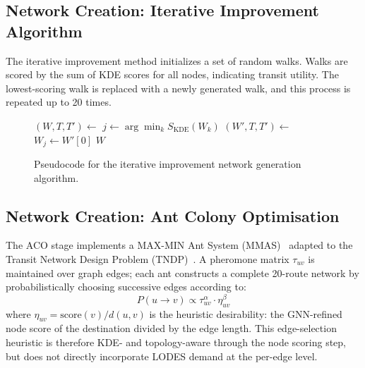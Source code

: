 \documentclass[sigconf,nonacm]{acmart}
\begin{document}
\subsection{Network Creation: Iterative Improvement Algorithm}

The iterative improvement method initializes a set of random walks. Walks are scored by the sum of KDE scores for all nodes, indicating transit utility. The lowest-scoring walk is replaced with a newly generated walk, and this process is repeated up to 20 times.

\begin{figure}[h]
\centering
\begin{minipage}{1\linewidth}
\begin{algorithmic}
    \State $(W, T, T') \gets$ 
        \State $j \gets \arg\min_{k} S_{\mathrm{KDE}}(W_k)$  
        \State $(W', T, T') \gets$ 
        \State $W_j \gets W'[0]$  
    \EndFor
    \State \Return $W$
\EndFunction
\end{algorithmic}
\caption{Pseudocode for the iterative improvement network generation algorithm.}
\label{fig:iterative_pseudocode}
\end{minipage}
\end{figure}

\subsection{Network Creation: Ant Colony Optimisation}
\label{sec:network_aco}

The ACO stage implements a MAX-MIN Ant System (MMAS)~\cite{stutzle2000mmas} adapted to the Transit Network Design Problem (TNDP)~\cite{nikolic2013aco}. A pheromone matrix $\tau_{uv}$ is maintained over graph edges; each ant constructs a complete 20-route network by probabilistically choosing successive edges according to:
\[
  P(u \to v) \propto \tau_{uv}^{\alpha} \cdot \eta_{uv}^{\beta}
\]
where $\eta_{uv} = \text{score}(v) / d(u,v)$ is the heuristic desirability: the GNN-refined node score of the destination divided by the edge length. This edge-selection heuristic is therefore KDE- and topology-aware through the node scoring step, but does not directly incorporate LODES demand at the per-edge level.
\end{document}
